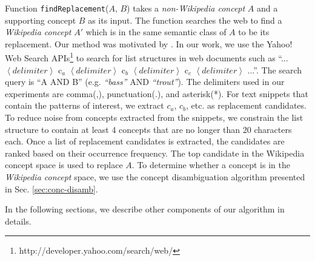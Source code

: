 Function \texttt{findReplacement}($A$, $B$) takes a {\em non-Wikipedia
  concept} $A$ and a supporting concept $B$ as its input. The function
searches the web to find a {\em Wikipedia concept} $A'$ which is in
the same semantic class of $A$ to be its replacement. Our method was
motivated by \cite{1321585}.  In our work, we use the Yahoo! Web
Search APIs\footnote{http://developer.yahoo.com/search/web/} to search
for list structures in web documents such as ``... $\left < delimiter
\right >$ c$_a$ $\left < delimiter \right >$ c$_b$ $\left < delimiter
\right >$ c$_c$ $\left < delimiter \right >$ ...''.  The search query
is ``A AND B'' (e.g. {\em ``bass''} AND {\em ``trout''}). The
delimiters used in our experiments are comma(,), punctuation(.), and
asterisk(*). For text snippets that contain the patterns of interest,
we extract $c_a$, $c_b$, etc. as replacement candidates. To reduce
noise from concepts extracted from the snippets, we constrain the list
structure to contain at least 4 concepts that are no longer than 20
characters each. Once a list of replacement candidates is extracted,
the candidates are ranked based on their occurrence frequency. The top
candidate in the Wikipedia concept space is used to replace
$A$. To determine whether a concept is in the {\em Wikipedia concept}
space, we use the concept disambiguation algorithm presented in
Sec. \ref{sec:conc-disamb}.

In the following sections, we describe other components of our
algorithm in details.


